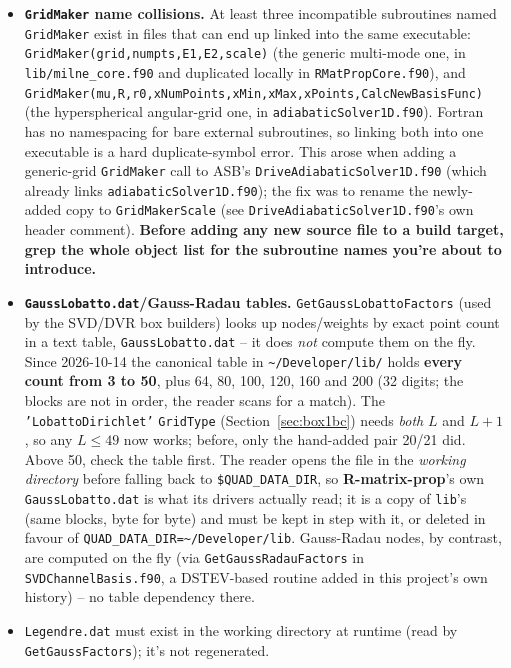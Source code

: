 \documentclass[11pt]{article}
\newcommand{\file}[1]{\texttt{#1}}
\newcommand{\sub}[1]{\texttt{#1}}
\newcommand{\repo}[1]{\textbf{#1}}
\begin{document}
\begin{itemize}
\item \textbf{\sub{GridMaker} name collisions.} At least three incompatible subroutines named
  \sub{GridMaker} exist in files that can end up linked into the same executable:
  \sub{GridMaker(grid,numpts,E1,E2,scale)} (the generic multi-mode one, in
  \file{lib/milne\_core.f90} and duplicated locally in \file{RMatPropCore.f90}), and
  \sub{GridMaker(mu,R,r0,xNumPoints,xMin,xMax,xPoints,CalcNewBasisFunc)} (the hyperspherical
  angular-grid one, in \file{adiabaticSolver1D.f90}). Fortran has no namespacing for bare
  external subroutines, so linking both into one executable is a hard duplicate-symbol error.
  This arose when adding a generic-grid \sub{GridMaker} call to ASB's
  \file{DriveAdiabaticSolver1D.f90} (which already links \file{adiabaticSolver1D.f90}); the fix
  was to rename the newly-added copy to \sub{GridMakerScale} (see
  \file{DriveAdiabaticSolver1D.f90}'s own header comment). \textbf{Before adding any new source
  file to a build target, grep the whole object list for the subroutine names you're about to
  introduce.}
\item \textbf{\file{GaussLobatto.dat}/Gauss-Radau tables.} \sub{GetGaussLobattoFactors} (used by
  the SVD/DVR box builders) looks up nodes/weights by exact point count in a text table,
  \file{GaussLobatto.dat} -- it does \emph{not} compute them on the fly. Since 2026-10-14 the
  canonical table in \file{\textasciitilde/Developer/lib/} holds \textbf{every count from 3 to 50},
  plus 64, 80, 100, 120, 160 and 200 (32 digits; the blocks are not in order, the reader scans for
  a match). The \texttt{'LobattoDirichlet'} \texttt{GridType} (Section~\ref{sec:box1bc}) needs
  \emph{both} $L$ and $L+1$, so any $L\le49$ now works; before, only the hand-added pair 20/21
  did. Above 50, check the table first. The reader opens the file in the \emph{working directory}
  before falling back to \texttt{\$QUAD\_DATA\_DIR}, so \repo{R-matrix-prop}'s own
  \file{GaussLobatto.dat} is what its drivers actually read; it is a copy of \file{lib}'s (same
  blocks, byte for byte) and must be kept in step with it, or deleted in favour of
  \texttt{QUAD\_DATA\_DIR=\textasciitilde/Developer/lib}. Gauss-Radau nodes, by contrast, are computed on the fly (via
  \sub{GetGaussRadauFactors} in \file{SVDChannelBasis.f90}, a DSTEV-based routine added in this
  project's own history) -- no table dependency there.
\item \texttt{Legendre.dat} must exist in the working directory at runtime (read by
  \sub{GetGaussFactors}); it's not regenerated.
\end{itemize}
\end{document}
